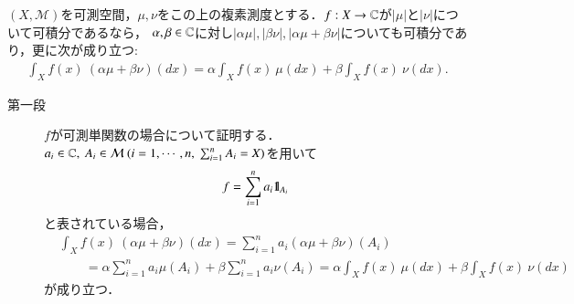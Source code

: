 	\begin{screen}
		\begin{thm}[積分の測度に関する線型性]
			$(X,\mathcal{M})$を可測空間，$\mu,\nu$をこの上の複素測度とする．$f:X \rightarrow \mathbb{C}$が$|\mu|$と$|\nu|$について可積分であるなら，
			$\alpha,\beta \in \mathbb{C}$に対し$|\alpha \mu|, |\beta \nu|, |\alpha \mu + \beta \nu|$についても可積分であり，更に次が成り立つ:
			\begin{align}
				\int_X f(x)\ (\alpha\mu + \beta\nu)(dx) = \alpha \int_X f(x)\ \mu(dx) + \beta \int_X f(x)\ \nu(dx).
			\end{align}
			\label{thm:linearity_of_integral_respect_to_measure}
		\end{thm}
	\end{screen}
	
	\begin{prf}
		\begin{description}
			\item[第一段]
				$f$が可測単関数の場合について証明する．
				$a_i \in \C,\ A_i \in \mathcal{M}\ (i=1,\cdots,n,\ \sum_{i=1}^{n} A_i = X)$を用いて
				\begin{align}
					f = \sum_{i=1}^{n} a_i \mbox{1}\hspace{-0.25em}\mbox{l}_{A_i}
				\end{align}
				と表されている場合，
				\begin{align}
					&\int_X f(x)\ (\alpha\mu + \beta\nu)(dx)
					= \sum_{i=1}^{n} a_i (\alpha\mu + \beta\nu)(A_i) \\
					&\qquad = \alpha \sum_{i=1}^{n} a_i \mu(A_i) + \beta \sum_{i=1}^{n} a_i \nu(A_i)
					= \alpha \int_X f(x)\ \mu(dx) + \beta \int_X f(x)\ \nu(dx)
				\end{align}
				が成り立つ．
				

\end{description}
\end{prf}
